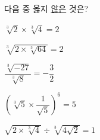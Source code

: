 다음 중 옳지 \underline{않은} 것은?
\begin{choicesii}{\rule[-3ex]{0pt}{8ex}$\sqrt[3]{2}\times\sqrt[3]{4}=2$}{\rule[-3ex]{0pt}{8ex}$\sqrt[3]{2\times\sqrt[3]{64}}=2$}{\rule[-3ex]{0pt}{8ex}$\dfrac{\sqrt[3]{-27}}{\sqrt[3]{8}}=-\dfrac{3}{2}$}{\rule[-3ex]{0pt}{8ex}$\left(\sqrt[3]{5}\times\dfrac{1}{\sqrt{5}}\right)^{6}=5$}{\rule[-3ex]{0pt}{8ex}$\sqrt{2\times\sqrt[3]{4}}\div\sqrt[3]{4\sqrt{2}}=1$}\end{choicesii}
